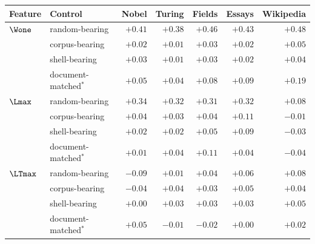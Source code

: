 \begin{table}[htbp]
\centering
\small
\begin{tabular}{llrrrrr}
\toprule
Feature & Control & Nobel & Turing & Fields & Essays & Wikipedia \\
\midrule
$\Wone$ & random-bearing & \cellcolor{tabV!45}$+0.41$ & \cellcolor{tabV!45}$+0.38$ & \cellcolor{tabV!45}$+0.46$ & \cellcolor{tabV!45}$+0.43$ & \cellcolor{tabV!45}$+0.48$ \\
 & corpus-bearing & \cellcolor{tabV!4}$+0.02$ & \cellcolor{tabV!2}$+0.01$ & \cellcolor{tabV!4}$+0.03$ & \cellcolor{tabV!3}$+0.02$ & \cellcolor{tabV!7}$+0.05$ \\
 & shell-bearing & \cellcolor{tabV!4}$+0.03$ & $+0.01$ & \cellcolor{tabV!5}$+0.03$ & \cellcolor{tabV!3}$+0.02$ & \cellcolor{tabV!6}$+0.04$ \\
 & document-matched$^\ast$ & \cellcolor{tabV!8}$+0.05$ & \cellcolor{tabV!5}$+0.04$ & \cellcolor{tabV!12}$+0.08$ & \cellcolor{tabV!14}$+0.09$ & \cellcolor{tabV!29}$+0.19$ \\
\midrule
$\Lmax$ & random-bearing & \cellcolor{tabV!45}$+0.34$ & \cellcolor{tabV!45}$+0.32$ & \cellcolor{tabV!45}$+0.31$ & \cellcolor{tabV!45}$+0.32$ & \cellcolor{tabV!12}$+0.08$ \\
 & corpus-bearing & \cellcolor{tabV!6}$+0.04$ & \cellcolor{tabV!5}$+0.03$ & \cellcolor{tabV!7}$+0.04$ & \cellcolor{tabV!17}$+0.11$ & $-0.01$ \\
 & shell-bearing & \cellcolor{tabV!3}$+0.02$ & \cellcolor{tabV!3}$+0.02$ & \cellcolor{tabV!7}$+0.05$ & \cellcolor{tabV!13}$+0.09$ & \cellcolor{tabB!5}$-0.03$ \\
 & document-matched$^\ast$ & \cellcolor{tabV!2}$+0.01$ & \cellcolor{tabV!6}$+0.04$ & \cellcolor{tabV!17}$+0.11$ & \cellcolor{tabV!6}$+0.04$ & \cellcolor{tabB!5}$-0.04$ \\
\midrule
$\LTmax$ & random-bearing & \cellcolor{tabB!13}$-0.09$ & $+0.01$ & \cellcolor{tabV!6}$+0.04$ & \cellcolor{tabV!8}$+0.06$ & \cellcolor{tabV!12}$+0.08$ \\
 & corpus-bearing & \cellcolor{tabB!6}$-0.04$ & \cellcolor{tabV!6}$+0.04$ & \cellcolor{tabV!5}$+0.03$ & \cellcolor{tabV!8}$+0.05$ & \cellcolor{tabV!7}$+0.04$ \\
 & shell-bearing & $+0.00$ & \cellcolor{tabV!4}$+0.03$ & \cellcolor{tabV!5}$+0.03$ & \cellcolor{tabV!4}$+0.03$ & \cellcolor{tabV!8}$+0.05$ \\
 & document-matched$^\ast$ & \cellcolor{tabV!7}$+0.05$ & $-0.01$ & \cellcolor{tabB!2}$-0.02$ & $+0.00$ & \cellcolor{tabV!3}$+0.02$ \\

\end{tabular}
\end{table}
